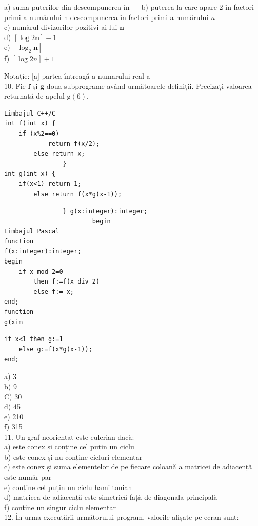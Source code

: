 \documentclass[10pt]{article}
\begin{document}
a) suma puterilor din descompunerea în $\quad$ b) puterea la care apare 2 în factori primi a numărului n descompunerea în factori primi a numărului $n$\\
c) numărul divizorilor pozitivi ai lui $\mathbf{n}$\\
d) $[\log 2 \mathbf{n}]-1$\\
e) $\left[\log _{2} \mathbf{n}\right]$\\
f) $[\log 2 n]+1$

Notație: [a] partea întreagă a numarului real a\\
10. Fie $\mathbf{f}$ și $\mathbf{g}$ două subprograme având următoarele definiții. Precizați valoarea returnată de apelul $\mathrm{g}(6)$.

\begin{verbatim}
Limbajul C++/C
int f(int x) {
    if (x%2==0)
            return f(x/2);
        else return x;
                }
int g(int x) {
    if(x<1) return 1;
        else return f(x*g(x-1));
\end{verbatim}

\begin{verbatim}
                } g(x:integer):integer;
                        begin
Limbajul Pascal
function
f(x:integer):integer;
begin
    if x mod 2=0
        then f:=f(x div 2)
        else f:= x;
end;
function
g(xim
\end{verbatim}

\begin{verbatim}
if x<1 then g:=1
    else g:=f(x*g(x-1));
end;
\end{verbatim}

a) 3\\
b) 9\\
C) 30\\
d) 45\\
e) 210\\
f) 315\\
11. Un graf neorientat este eulerian dacă:\\
a) este conex și conține cel puțin un ciclu\\
b) este conex și nu conține cicluri elementar\\
c) este conex și suma elementelor de pe fiecare coloană a matricei de adiacență este număr par\\
e) conține cel puțin un ciclu hamiltonian\\
d) matricea de adiacență este simetrică față de diagonala principală\\
f) conține un singur ciclu elementar\\
12. În urma executării următorului program, valorile afișate pe ecran sunt:
\end{document}
